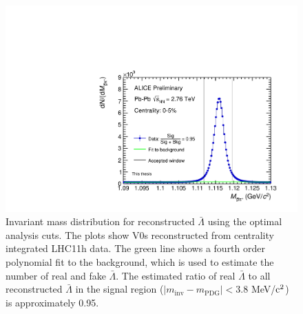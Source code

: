 \begin{figure}[hbtp]
\includegraphics[width=36pc]{Figures/2014-05-11-ALamMinv-CommentCorrections.pdf}
\caption[$\bar{\Lambda}$ invariant mass distributions]{Invariant mass distribution for reconstructed $\bar{\Lambda}$ using the optimal analysis cuts.  
The plots show V0s reconstructed from centrality integrated LHC11h data.  
The green line shows a fourth order polynomial fit to the background, which is used to estimate the number of real and fake $\bar{\Lambda}$.  
The estimated ratio of real $\bar{\Lambda}$ to all reconstructed $\bar{\Lambda}$ in the signal region ($ \lvert m_{\mathrm{inv}} - m_{\mathrm{PDG}}\rvert < 3.8$ MeV/$\rm c^2$) is approximately 0.95.}
\label{fig:AppendixALamInvMass}
\end{figure}

